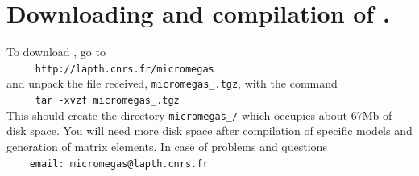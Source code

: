 \documentclass[12pt,a4paper]{article}
\begin{document}
\section{Downloading and compilation of \micro.}
To   download  \micro, go to    \\  
\verb|     http://lapth.cnrs.fr/micromegas|\\
and unpack the file received, \verb|micromegas_|\VERSION\verb|.tgz|, with the command\\
\verb|     tar -xvzf micromegas_|\VERSION\verb|.tgz|\\
This should create the directory \verb|micromegas_|\VERSION\verb|/| which occupies about 67Mb of disk space. You will need more disk space after compilation of
specific models and generation of matrix elements.
In case of problems and questions\\
\verb|    email: micromegas@lapth.cnrs.fr|\\
\end{document}
